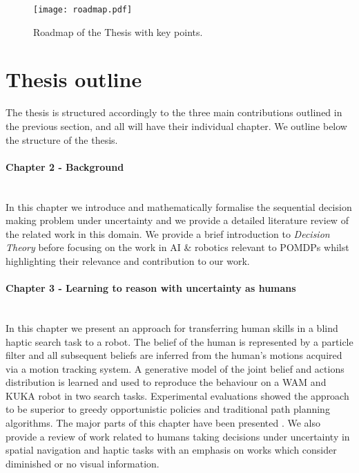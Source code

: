 \begin{figure}
  \centering
  \texttt{[image: roadmap.pdf]}
  \caption{Roadmap of the Thesis with key points. }
\end{figure}


\section{Thesis outline}

The thesis is structured accordingly to the three main contributions outlined in the previous section, 
and all will have their individual chapter. We outline below the structure of the thesis.

\begin{minipage}[c]{0.9\textwidth}
\paragraph{Chapter 2 - Background}\\
In this chapter we introduce and mathematically formalise the sequential decision making problem 
under uncertainty and we provide a detailed literature review of the related work in this domain.
We provide a brief introduction to \textit{Decision Theory} before focusing on the work 
in AI \& robotics relevant to POMDPs whilst highlighting their relevance and contribution to our work. 
\end{minipage}

\begin{minipage}[c]{0.9\textwidth}
\paragraph{Chapter 3 - Learning to reason with uncertainty as humans}\\
In this chapter we present an approach for transferring human skills in a blind haptic 
search task to a robot. The belief of the human is represented by a particle filter and 
all subsequent beliefs are inferred from the human's motions acquired via a motion tracking
system. A generative model of the joint belief and actions distribution is learned and used
to reproduce the behaviour on a WAM and KUKA robot in two search tasks. Experimental 
evaluations showed the approach to be superior to greedy opportunistic policies and traditional
path planning algorithms. The major parts of this chapter have been presented \cite{Chambrier2014}.
We also provide a review of work related to humans taking decisions under uncertainty 
in spatial navigation and haptic tasks with an emphasis on works which consider diminished or no 
visual information. 
\end{minipage}


